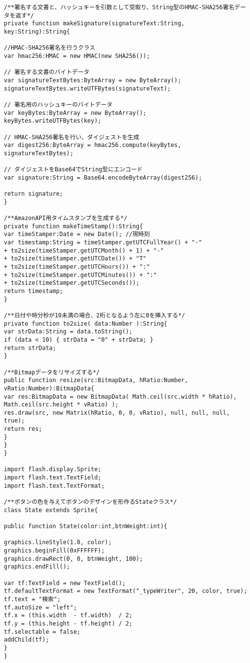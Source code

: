 {\begin{verbatim}
/**署名する文書と、ハッシュキーを引数として受取り、String型のHMAC-SHA256署名データを返す*/
private function makeSignature(signatureText:String, key:String):String{

//HMAC-SHA256署名を行うクラス
var hmac256:HMAC = new HMAC(new SHA256());

// 署名する文書のバイトデータ
var signatureTextBytes:ByteArray = new ByteArray();
signatureTextBytes.writeUTFBytes(signatureText);

// 署名用のハッシュキーのバイトデータ
var keyBytes:ByteArray = new ByteArray();
keyBytes.writeUTFBytes(key);

// HMAC-SHA256署名を行い、ダイジェストを生成
var digest256:ByteArray = hmac256.compute(keyBytes, signatureTextBytes);

// ダイジェストをBase64でString型にエンコード
var signature:String = Base64.encodeByteArray(digest256);

return signature;
}

/**AmazonAPI用タイムスタンプを生成する*/
private function makeTimeStamp():String{
var timeStamper:Date = new Date(); //現時刻
var timestamp:String = timeStamper.getUTCFullYear() + "-"
+ to2size(timeStamper.getUTCMonth() + 1) + "-"
+ to2size(timeStamper.getUTCDate()) + "T"
+ to2size(timeStamper.getUTCHours()) + ":"
+ to2size(timeStamper.getUTCMinutes()) + ":"
+ to2size(timeStamper.getUTCSeconds());
return timestamp;
}

/**日付や時分秒が10未満の場合、2桁となるよう左に0を挿入する*/
private function to2size( data:Number ):String{
var strData:String = data.toString();
if (data < 10) { strData = "0" + strData; }
return strData;
}

/**Bitmapデータをリサイズする*/
public function resize(src:BitmapData, hRatio:Number, vRatio:Number):BitmapData{
var res:BitmapData = new BitmapData( Math.ceil(src.width * hRatio), Math.ceil(src.height * vRatio) );
res.draw(src, new Matrix(hRatio, 0, 0, vRatio), null, null, null, true);
return res;
}
}
}

import flash.display.Sprite;
import flash.text.TextField;
import flash.text.TextFormat;

/**ボタンの色を与えてボタンのデザインを形作るStateクラス*/
class State extends Sprite{

public function State(color:int,btnWeight:int){

graphics.lineStyle(1.0, color);
graphics.beginFill(0xFFFFFF);
graphics.drawRect(0, 0, btnWeight, 100);
graphics.endFill();

var tf:TextField = new TextField();
tf.defaultTextFormat = new TextFormat("_typeWriter", 20, color, true);
tf.text = "検索";
tf.autoSize = "left";
tf.x = (this.width  - tf.width)  / 2;
tf.y = (this.height - tf.height) / 2;
tf.selectable = false;
addChild(tf);
}
}
\end{verbatim}
 }


